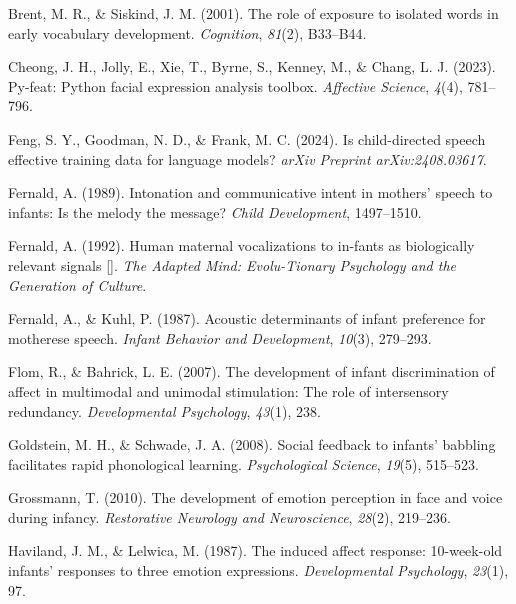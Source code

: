 \documentclass[10pt, letterpaper]{article}
\begin{document}
\begin{CSLReferences}{1}{0}
Brent, M. R., \& Siskind, J. M. (2001). The role of exposure to isolated
words in early vocabulary development. \emph{Cognition}, \emph{81}(2),
B33--B44.

Cheong, J. H., Jolly, E., Xie, T., Byrne, S., Kenney, M., \& Chang, L.
J. (2023). Py-feat: Python facial expression analysis toolbox.
\emph{Affective Science}, \emph{4}(4), 781--796.

Feng, S. Y., Goodman, N. D., \& Frank, M. C. (2024). Is child-directed
speech effective training data for language models? \emph{arXiv Preprint
arXiv:2408.03617}.

Fernald, A. (1989). Intonation and communicative intent in mothers'
speech to infants: Is the melody the message? \emph{Child Development},
1497--1510.

Fernald, A. (1992). Human maternal vocalizations to in-fants as
biologically relevant signals {[}{]}. \emph{The Adapted Mind:
Evolu-Tionary Psychology and the Generation of Culture}.

Fernald, A., \& Kuhl, P. (1987). Acoustic determinants of infant
preference for motherese speech. \emph{Infant Behavior and Development},
\emph{10}(3), 279--293.

Flom, R., \& Bahrick, L. E. (2007). The development of infant
discrimination of affect in multimodal and unimodal stimulation: The
role of intersensory redundancy. \emph{Developmental Psychology},
\emph{43}(1), 238.

Goldstein, M. H., \& Schwade, J. A. (2008). Social feedback to infants'
babbling facilitates rapid phonological learning. \emph{Psychological
Science}, \emph{19}(5), 515--523.

Grossmann, T. (2010). The development of emotion perception in face and
voice during infancy. \emph{Restorative Neurology and Neuroscience},
\emph{28}(2), 219--236.

Haviland, J. M., \& Lelwica, M. (1987). The induced affect response:
10-week-old infants' responses to three emotion expressions.
\emph{Developmental Psychology}, \emph{23}(1), 97.


\end{CSLReferences}
\end{document}
